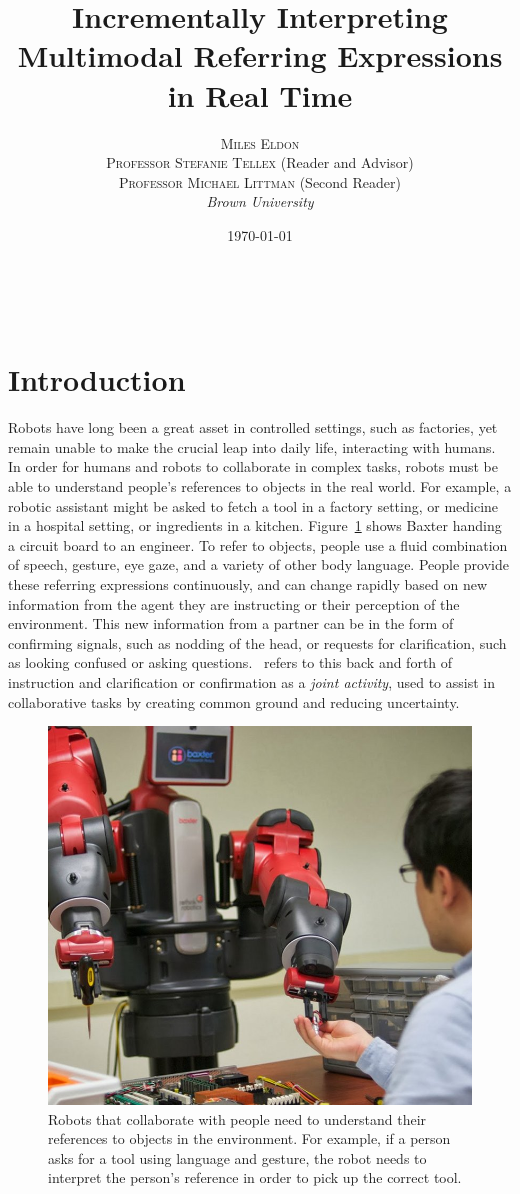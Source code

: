 \documentclass[a4paper, 11pt]{article} %
\title{\textbf{Incrementally Interpreting Multimodal Referring Expressions in Real Time}} %
\author{\textsc{Miles Eldon}\\ %
\textsc{Professor Stefanie Tellex} (Reader and Advisor)\\
{\textsc{Professor Michael Littman} (Second Reader)}
\\{\textit{Brown University}}} %
\date{\today} %
\makeatletter
\renewcommand{\maketitle}{ %
\begin{flushright} %
{\LARGE\@title} %

\vspace{50pt} %

{\large\@author} %
\\\@date %

\vspace{40pt} %
\end{flushright}
}
\makeatother
\begin{document}
\maketitle %
\newpage
\tableofcontents
\newpage
\section{Introduction}
Robots have long been a great asset in controlled settings, such as factories, yet remain unable to make the crucial leap into daily life, interacting with humans. In order for humans and robots to collaborate in complex tasks, robots must be able to understand people's references to objects in the real world. For example, a robotic assistant might be asked to fetch a tool in a factory setting, or medicine in a hospital setting, or ingredients in a kitchen. Figure~\ref{fig:example} shows Baxter handing a circuit board to an engineer. To refer to objects, people use a fluid combination of speech, gesture, eye gaze, and a variety of other body language. People provide these referring expressions continuously, and can change rapidly based on new information from the agent they are instructing or their perception of the environment. This new information from a partner can be in the form of confirming signals, such as nodding of the head, or requests for clarification, such as looking confused or asking questions.~\citet{clark96} refers to this back and forth of instruction and clarification or confirmation as a \textit{joint activity}, used to assist in collaborative tasks by creating common ground and reducing uncertainty.

\begin{figure}[h]
\centering
\includegraphics[width=0.5\linewidth]{images/baxter_scene_cropped.jpg}
\caption{Robots that collaborate with people need to understand their
  references to objects in the environment.  For example, if a person
  asks for a tool using language and gesture, the robot needs to
  interpret the person's reference in order to pick up the correct
  tool.\label{fig:example}}
\end{figure}
\end{document}

